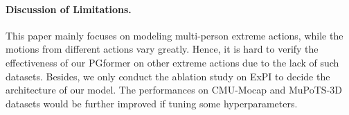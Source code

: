\documentclass[10pt,twocolumn,letterpaper]{article}
\begin{document}
\paragraph*{Discussion of Limitations.} 
This paper mainly focuses on modeling multi-person extreme actions, while the motions from different actions vary greatly. 
Hence, it is hard to verify the effectiveness of our PGformer on other extreme actions due to the lack of such datasets. 
Besides, we only conduct the ablation study on ExPI to decide the architecture of our model. 
The performances on CMU-Mocap and MuPoTS-3D datasets would be further improved if tuning some hyperparameters.
\end{document}
